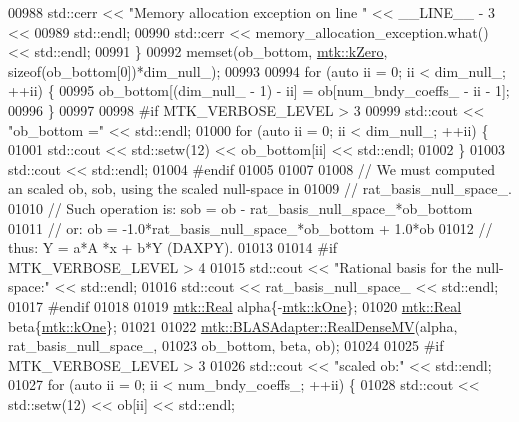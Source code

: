\begin{DoxyCode}
{{00988       std::cerr << \textcolor{stringliteral}{"Memory allocation exception on line "} << \_\_LINE\_\_ - 3 <<
00989         std::endl;
00990       std::cerr << memory\_allocation\_exception.what() << std::endl;
00991     \}
00992     memset(ob\_bottom, \hyperlink{group__c01-roots_ga59a451a5fae30d59649bcda274fea271}{mtk::kZero}, \textcolor{keyword}{sizeof}(ob\_bottom[0])*dim\_null\_);
00993 
00994     \textcolor{keywordflow}{for} (\textcolor{keyword}{auto} ii = 0; ii < dim\_null\_; ++ii) \{
00995       ob\_bottom[(dim\_null\_ - 1) - ii] = ob[num\_bndy\_coeffs\_ - ii - 1];
00996     \}
00997 
00998 \textcolor{preprocessor}{    #if MTK\_VERBOSE\_LEVEL > 3}
00999     std::cout << \textcolor{stringliteral}{"ob\_bottom ="} << std::endl;
01000     \textcolor{keywordflow}{for} (\textcolor{keyword}{auto} ii = 0; ii < dim\_null\_; ++ii) \{
01001       std::cout << std::setw(12) << ob\_bottom[ii] << std::endl;
01002     \}
01003     std::cout << std::endl;
01004 \textcolor{preprocessor}{    #endif}
01005 
01007 
01008     \textcolor{comment}{// We must computed an scaled ob, sob, using the scaled null-space in}
01009     \textcolor{comment}{// rat\_basis\_null\_space\_.}
01010     \textcolor{comment}{// Such operation is: sob = ob - rat\_basis\_null\_space\_*ob\_bottom}
01011     \textcolor{comment}{// or:                 ob = -1.0*rat\_basis\_null\_space\_*ob\_bottom + 1.0*ob}
01012     \textcolor{comment}{// thus:                Y =    a*A    *x         +   b*Y (DAXPY).}
01013 
01014 \textcolor{preprocessor}{    #if MTK\_VERBOSE\_LEVEL > 4}
01015     std::cout << \textcolor{stringliteral}{"Rational basis for the null-space:"} << std::endl;
01016     std::cout << rat\_basis\_null\_space\_ << std::endl;
01017 \textcolor{preprocessor}{    #endif}
01018 
01019     \hyperlink{group__c01-roots_gac080bbbf5cbb5502c9f00405f894857d}{mtk::Real} alpha\{-\hyperlink{group__c01-roots_ga26407c24d43b6b95480943340d285c71}{mtk::kOne}\};
01020     \hyperlink{group__c01-roots_gac080bbbf5cbb5502c9f00405f894857d}{mtk::Real} beta\{\hyperlink{group__c01-roots_ga26407c24d43b6b95480943340d285c71}{mtk::kOne}\};
01021 
01022     \hyperlink{classmtk_1_1BLASAdapter_afdcac059a4294287cb55638221220646}{mtk::BLASAdapter::RealDenseMV}(alpha, rat\_basis\_null\_space\_,
01023                                   ob\_bottom, beta, ob);
01024 
01025 \textcolor{preprocessor}{    #if MTK\_VERBOSE\_LEVEL > 3}
01026     std::cout << \textcolor{stringliteral}{"scaled ob:"} << std::endl;
01027     \textcolor{keywordflow}{for} (\textcolor{keyword}{auto} ii = 0; ii < num\_bndy\_coeffs\_; ++ii) \{
01028       std::cout << std::setw(12) << ob[ii] << std::endl;
}}
\end{DoxyCode}

